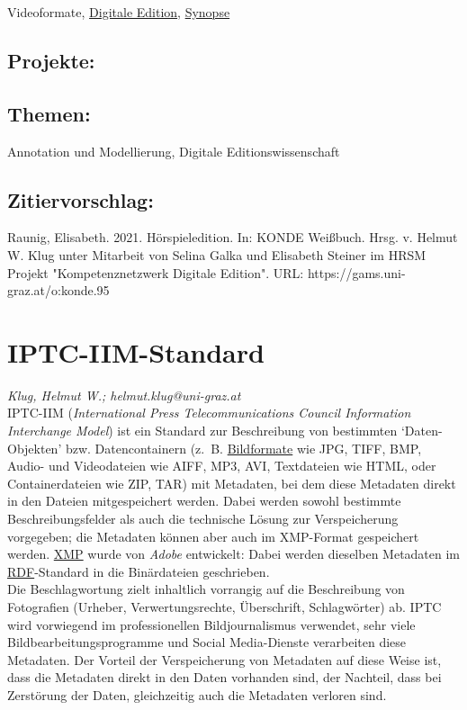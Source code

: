 \documentclass{article}
\begin{document}
{                           Videoformate}, \href{https://gams.uni-graz.at/o:konde.59}{Digitale Edition}, \href{https://gams.uni-graz.at/o:konde.174}{Synopse}\subsection*{Projekte:}\subsection*{Themen:}Annotation und Modellierung, Digitale Editionswissenschaft\subsection*{Zitiervorschlag:}Raunig, Elisabeth. 2021. Hörspieledition. In: KONDE Weißbuch. Hrsg. v. Helmut W. Klug unter Mitarbeit von Selina Galka und Elisabeth Steiner im HRSM Projekt "Kompetenznetzwerk Digitale Edition". URL: https://gams.uni-graz.at/o:konde.95\newpage\section*{IPTC-IIM-Standard} \emph{Klug, Helmut W.; helmut.klug@uni-graz.at }\\
        
    IPTC-IIM (\emph{International Press Telecommunications Council Information Interchange Model}) ist ein Standard zur Beschreibung von bestimmten ‘Daten-Objekten’ bzw. Datencontainern (z. B. \href{http://gams.uni-graz.at/o:konde.122}{Bildformate} wie JPG, TIFF, BMP, Audio- und Videodateien wie AIFF, MP3, AVI, Textdateien wie HTML, oder Containerdateien wie ZIP, TAR) mit Metadaten, bei dem diese Metadaten direkt in den Dateien mitgespeichert werden. Dabei werden sowohl bestimmte Beschreibungsfelder als auch die technische Lösung zur Verspeicherung vorgegeben; die Metadaten können aber auch im XMP-Format gespeichert werden. \href{http://gams.uni-graz.at/o:konde.81}{XMP} wurde von \emph{Adobe} entwickelt: Dabei werden dieselben Metadaten im \href{http://gams.uni-graz.at/o:konde.131}{RDF}-Standard in die Binärdateien geschrieben.\\
            
        Die Beschlagwortung zielt inhaltlich vorrangig auf die Beschreibung von Fotografien (Urheber, Verwertungsrechte, Überschrift, Schlagwörter) ab. IPTC wird vorwiegend im professionellen Bildjournalismus verwendet, sehr viele Bildbearbeitungsprogramme und Social Media-Dienste verarbeiten diese Metadaten. Der Vorteil der Verspeicherung von Metadaten auf diese Weise ist, dass die Metadaten direkt in den Daten vorhanden sind, der Nachteil, dass bei Zerstörung der Daten, gleichzeitig auch die Metadaten verloren sind.\\
            
\end{document}
